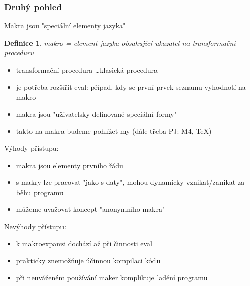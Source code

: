\documentclass[10pt,a4paper]{article}
\newtheorem{definition}{Definice}
\begin{document}
\subsubsection{Druhý pohled}
\begin{center}
	Makra jsou "speciální elementy jazyka"
\end{center}
\begin{definition}
	makro = element jazyka obsahující ukazatel na transformační proceduru
\end{definition}
\begin{itemize}
	\item transformační procedura \dots klasická procedura
	\item je potřeba rozšířit eval: případ, kdy se první prvek seznamu vyhodnotí na makro
	\item makra jsou "uživatelsky definované speciální formy"
	\item takto na makra budeme pohlížet my (dále třeba PJ: M4, \TeX)
\end{itemize}
Výhody přístupu:
\begin{itemize}
	\item makra jsou elementy prvního řádu
	\item s makry lze pracovat "jako s daty", mohou dynamicky vznikat/zanikat za běhu programu
	\item můžeme uvažovat koncept "anonymního makra"
\end{itemize}
Nevýhody přístupu:
\begin{itemize}
	\item k makroexpanzi dochází až při činnosti eval
	\item prakticky znemožňuje účinnou kompilaci kódu
	\item při neuváženém používání maker komplikuje ladění programu
\end{itemize}
\end{document}
